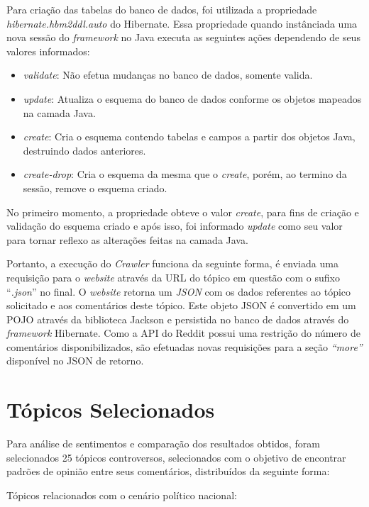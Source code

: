 Para criação das tabelas do banco de dados, foi utilizada a propriedade
\textit{hibernate.hbm2ddl.auto} do Hibernate. Essa propriedade quando
instânciada uma nova sessão do \textit{framework} no Java executa as seguintes
ações dependendo de seus valores informados:


\begin{itemize}
  \item \textit{validate}: Não efetua mudanças no banco de dados, somente
  valida.
  \item \textit{update}: Atualiza o esquema do banco de dados conforme os
  objetos mapeados na camada Java.
  \item \textit{create}: Cria o esquema contendo tabelas e campos a partir dos
  objetos Java, destruindo dados anteriores.
  \item \textit{create-drop}: Cria o esquema da mesma que o \textit{create},
  porém, ao termino da sessão, remove o esquema criado.
\end{itemize}

No primeiro momento, a propriedade obteve o valor \textit{create}, para fins de
criação e validação do esquema criado e após isso, foi informado \textit{update}
como seu valor para tornar reflexo as alterações feitas na camada Java.

Portanto, a execução do \textit{Crawler} funciona da seguinte forma, é enviada
uma requisição para o \textit{website} através da URL do tópico em questão com o
sufixo ``\textit{.json}'' no final. O \textit{website} retorna um
\textit{JSON} com os dados referentes ao tópico solicitado e aos comentários
deste tópico. Este objeto \ac{JSON} é convertido em um \ac{POJO} através da
biblioteca Jackson e persistida no banco de dados através do \textit{framework}
Hibernate. Como a API do Reddit possui uma restrição do número de comentários
disponibilizados, são efetuadas novas requisições para a seção \textit{``more''}
disponível no \ac{JSON} de retorno.

\section{Tópicos Selecionados}

Para análise de sentimentos e comparação dos resultados obtidos, foram
selecionados 25 tópicos controversos, selecionados com o objetivo de encontrar
padrões de opinião entre seus comentários, distribuídos da seguinte forma:

Tópicos relacionados com o cenário político nacional:

